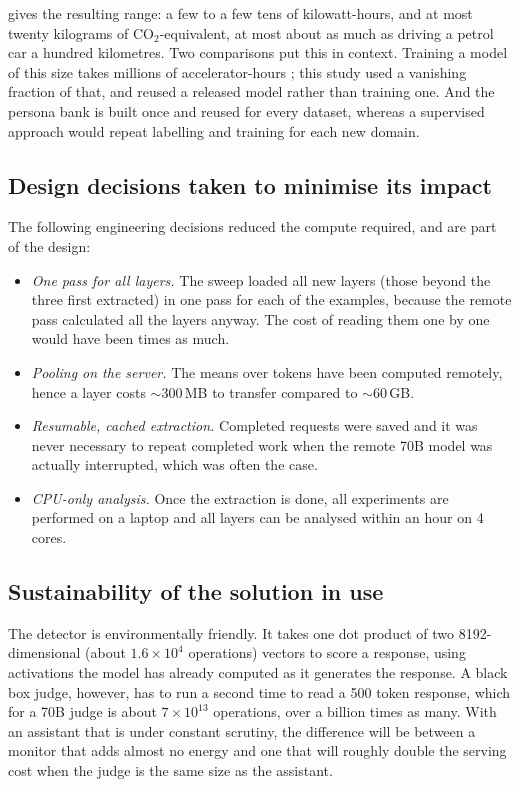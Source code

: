  gives the resulting range: a few to a few tens of kilowatt-hours, and at most
twenty kilograms of CO$_2$-equivalent, at most about as much as driving a petrol car a hundred
kilometres. Two comparisons put this in context. Training a model of this size takes millions of
accelerator-hours \cite{grattafiori2024llama}; this study used a vanishing fraction of that, and
reused a released model rather than training one. And the persona bank is built once and reused for
every dataset, whereas a supervised approach would repeat labelling and training for each new
domain.

\subsection{Design decisions taken to minimise its impact}

The following engineering decisions reduced the compute required, and are part of the design:
\begin{itemize}[leftmargin=1.2em, itemsep=2pt]
\item \emph{One pass for all layers.} The sweep loaded all  new layers (those beyond the
  three first extracted) in one pass for each of the examples, because the remote pass calculated all the layers anyway. The cost
  of reading them one by one would have been  times as much.
\item \emph{Pooling on the server.} The means over tokens have been computed remotely, hence a layer
  costs $\sim$300\,MB to transfer compared to $\sim$60\,GB.
\item \emph{Resumable, cached extraction.} Completed requests were saved and it was never necessary
  to repeat completed work when the remote 70B model was actually interrupted, which was often the
  case.
\item \emph{CPU-only analysis.} Once the extraction is done, all experiments are performed on a
  laptop and all  layers can be analysed within an hour on 4 cores.
\end{itemize}

\subsection{Sustainability of the solution in use}

The detector is environmentally friendly. It takes one dot product of two 8192-dimensional
(about $1.6 \times 10^{4}$ operations) vectors to score a response, using activations the model has
already computed as it generates the response. A black box judge, however, has to run a
second time to read a 500 token response, which for a 70B judge is about $7 \times 10^{13}$ operations,
over a billion times as many. With an assistant that is under constant scrutiny, the difference will
be between a monitor that adds almost no energy and one that will roughly double the serving
cost when the judge is the same size as the assistant.

